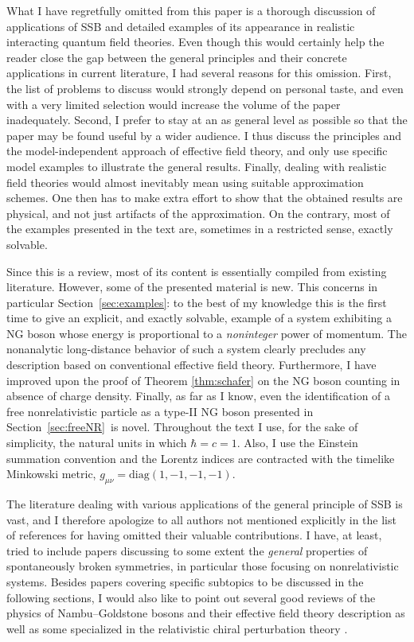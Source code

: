 \documentclass[final,2p,times,12pt,sort&compress]{elsarticle}
\begin{document}
What I have regretfully omitted from this paper is a thorough discussion of
applications of SSB and detailed examples of its appearance in realistic
interacting quantum field theories. Even though this would certainly help the
reader close the gap between the general principles and their concrete
applications in current literature, I had several reasons for this omission.
First, the list of problems to discuss would strongly depend on personal taste,
and even with a very limited selection would increase the volume of the paper
inadequately. Second, I prefer to stay at an as general level as possible so
that the paper may be found useful by a wider audience. I thus discuss the
principles and the model-independent approach of effective field theory, and
only use specific model examples to illustrate the general results. Finally,
dealing with realistic field theories would almost inevitably mean using
suitable approximation schemes. One then has to make extra effort to show that
the obtained results are physical, and not just artifacts of the approximation.
On the contrary, most of the examples presented in the text are, sometimes in a
restricted sense, exactly solvable.

Since this is a review, most of its content is essentially compiled from
existing literature. However, some of the presented material is new. This
concerns in particular Section~\ref{sec:examples}: to the best of my knowledge
this is the first time to give an explicit, and exactly solvable, example of a
system exhibiting a NG boson whose energy is proportional to a \emph{noninteger}
power of momentum. The nonanalytic long-distance behavior of such a system
clearly precludes any description based on conventional effective field theory.
Furthermore, I have improved upon the proof of Theorem \ref{thm:schafer} on the
NG boson counting in absence of charge density. Finally, as far as I know, even
the identification of a free nonrelativistic particle as a type-II NG boson
presented in Section~\ref{sec:freeNR}\ is novel. Throughout the text I use, for
the sake of simplicity, the natural units in which $\hbar=c=1$. Also, I use the
Einstein summation convention and the Lorentz indices are contracted with the
timelike Minkowski metric, $g_{\mu\nu}=\mathrm{diag}(1,-1,-1,-1)$.

The literature dealing with various applications of the general principle of
SSB is vast, and I therefore apologize to all authors not mentioned explicitly
in the list of references for having omitted their valuable contributions. I
have, at least, tried to include papers discussing to some extent the
\emph{general} properties of spontaneously broken symmetries, in particular
those focusing on nonrelativistic systems. Besides papers covering specific
subtopics to be discussed in the following sections, I would also like to point
out several good reviews of the physics of Nambu--Goldstone bosons and their
effective field theory description
\cite{Georgi:1994qn,Kaplan:1995uv,Manohar:1996cq,Pich:1998xt,Burgess:1998ku}
as well as some specialized in the relativistic chiral perturbation theory
\cite{Scherer:2002tk,Bijnens:2006zp,Scherer:2009bt}.
\end{document}
